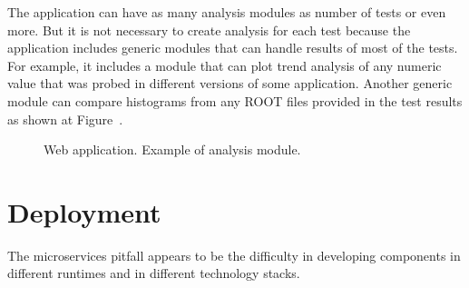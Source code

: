 \documentclass[a4paper]{jpconf}
\begin{document}
The application can have as many analysis modules as  number of tests or even
more. But it is not necessary to create analysis for each test because the
application includes generic modules that can handle results of most of the
tests. For example, it includes a module that can plot trend analysis of any
numeric value that was probed in different versions of some application. Another
generic module can compare histograms from any ROOT files provided in the
test results as  shown at Figure~.


\begin{figure}[H]
\centering
{}
\quad
{}
\label{figwebapp}
\caption{Web application. Example of analysis module.}
\end{figure}

\section{Deployment}
The microservices pitfall appears to be the difficulty in developing components in different runtimes and in
different technology stacks.
\end{document}
